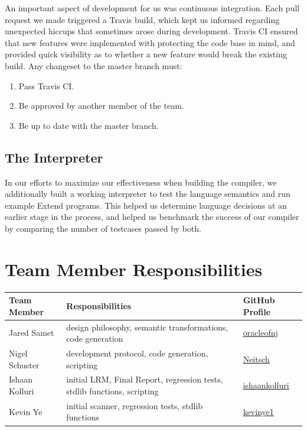   \medskip \noindent
  An important aspect of development for us was continuous integration. Each pull request we made triggered a Travis build, which kept us informed regarding unexpected hiccups that sometimes arose during development. Travis CI ensured that new features were implemented with protecting the code base in mind, and provided quick visibility as to whether a new feature would break the existing build. Any changeset to the master branch must:

  \begin{enumerate}
    \item Pass Travis CI.
    \item Be approved by another member of the team.
    \item Be up to date with the master branch.
  \end{enumerate}

  \subsection{The Interpreter}
  In our efforts to maximize our effectiveness when building the compiler, we additionally built a working interpreter to test the language semantics and run example Extend programs. This helped us determine language decisions at an earlier stage in the process, and helped us benchmark the success of our compiler by comparing the number of testcases passed by both.

\section{Team Member Responsibilities}

\begin{tabular}{ | l | l | l |}\hline
  Team Member  & Responsibilities      & GitHub Profile\\ \hline
  Jared Samet & design philosophy, semantic transformations, code generation  & \underline{\href{https://github.com/oracleofnj}{oracleofnj}}\\
  Nigel Schuster & development protocol, code generation, scripting  & \underline{\href{https://github.com/Neitsch}{Neitsch}}\\
  Ishaan Kolluri & initial LRM, Final Report, regression tests, stdlib functions, scripting & \underline{\href{https://github.com/ishaankolluri}{ishaankolluri}}\\
  Kevin Ye & initial scanner, regression tests, stdlib functions & \underline{\href{https://github.com/kevinye1}{kevinye1}}\\ \hline
\end{tabular}
